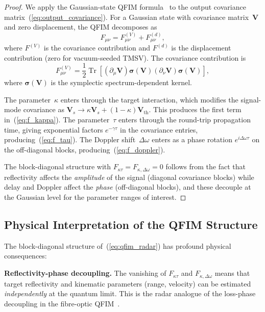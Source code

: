 \documentclass[journal]{IEEEtran}
\DeclareMathOperator{\Tr}{Tr}
\begin{document}
\begin{proof}
We apply the Gaussian-state QFIM formula~\cite{serafini2017quantum} to the output covariance matrix~(\ref{eq:output_covariance}). For a Gaussian state with covariance matrix~$\mathbf{V}$ and zero displacement, the QFIM decomposes as
\begin{equation}\label{eq:gaussian_qfim}
F_{\mu\nu} = F_{\mu\nu}^{(V)} + F_{\mu\nu}^{(d)},
\end{equation}
where $F^{(V)}$ is the covariance contribution and $F^{(d)}$ is the displacement contribution (zero for vacuum-seeded TMSV). The covariance contribution is
\begin{equation}
F_{\mu\nu}^{(V)} = \frac{1}{2}\Tr\left[\left(\partial_\mu\mathbf{V}\right)\boldsymbol{\sigma}(\mathbf{V})\left(\partial_\nu\mathbf{V}\right)\boldsymbol{\sigma}(\mathbf{V})\right],
\end{equation}
where $\boldsymbol{\sigma}(\mathbf{V})$ is the symplectic spectrum-dependent kernel.

The parameter~$\kappa$ enters through the target interaction, which modifies the signal-mode covariance as $\mathbf{V}_s \to \kappa\mathbf{V}_s + (1-\kappa)\mathbf{V}_{\text{th}}$. This produces the first term in~(\ref{eq:f_kappa}). The parameter~$\tau$ enters through the round-trip propagation time, giving exponential factors $e^{-\gamma\tau}$ in the covariance entries, producing~(\ref{eq:f_tau}). The Doppler shift~$\Delta\omega$ enters as a phase rotation $e^{i\Delta\omega\tau}$ on the off-diagonal blocks, producing~(\ref{eq:f_doppler}).

The block-diagonal structure with $F_{\kappa\tau} = F_{\kappa,\Delta\omega} = 0$ follows from the fact that reflectivity affects the \textit{amplitude} of the signal (diagonal covariance blocks) while delay and Doppler affect the \textit{phase} (off-diagonal blocks), and these decouple at the Gaussian level for the parameter ranges of interest.
\end{proof}

\subsection{Physical Interpretation of the QFIM Structure}

The block-diagonal structure of~(\ref{eq:qfim_radar}) has profound physical consequences:

\textbf{Reflectivity-phase decoupling.} The vanishing of $F_{\kappa\tau}$ and $F_{\kappa,\Delta\omega}$ means that target reflectivity and kinematic parameters (range, velocity) can be estimated \textit{independently} at the quantum limit. This is the radar analogue of the loss-phase decoupling in the fibre-optic QFIM~\cite{gautum2024rigorous}.
\end{document}
